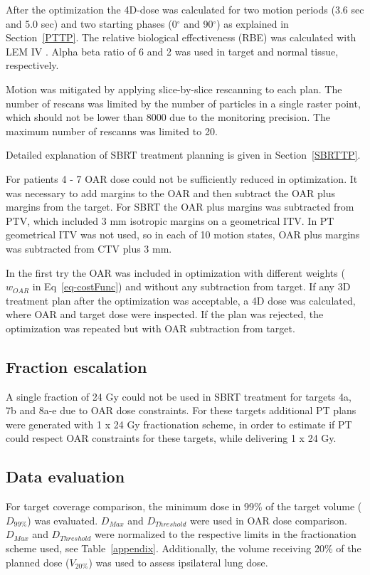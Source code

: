 \documentclass[type=dr, dr=rernat, accentcolor=tud7b,colorbacktitle, bigchapter, openright, twoside, 12pt ]{tudthesis}
\begin{document}
After the optimization the 4D-dose was calculated for two motion periods (3.6 sec and 5.0 sec) and two starting phases (0$^\circ$ and 90$^\circ$) as explained in Section~\ref{PTTP}. 
The relative biological effectiveness (RBE) was calculated with LEM IV \cite{Elsaesser2010}. 
Alpha beta ratio of 6 and 2 was used in target and normal tissue, respectively.

Motion was mitigated by applying slice-by-slice rescanning to each plan. 
The number of rescans was limited by the number of particles in a single raster point, which should not be lower than 8000 due to the
monitoring precision. The maximum number of rescanns was limited to 20.

Detailed explanation of SBRT treatment planning is given in Section~\ref{SBRTTP}.

For patients 4 - 7 OAR dose could not be sufficiently reduced in optimization. It was necessary to add margins to the OAR and then 
subtract the OAR plus margins from the target. For SBRT the OAR plus margins was subtracted from PTV, which included 3 mm isotropic margins on a geometrical ITV. 
In PT geometrical ITV was not used, so in each of 10 motion states, OAR plus margins was subtracted from CTV plus 3 mm. 

In the first try the OAR was included in optimization with different weights ($w_{OAR}$ in Eq~\ref{eq-costFunc}) and without any subtraction from target. 
If any 3D treatment plan after the optimization was acceptable, a 4D dose was calculated, 
where OAR and target dose were inspected. If the plan was rejected, the optimization was repeated but with OAR subtraction from target. 



\subsection{Fraction escalation}

A single fraction of 24 Gy could not be used in SBRT treatment for targets 4a, 7b and 8a-e due to OAR dose constraints. For these targets additional PT plans were generated with 1 x 24 Gy fractionation scheme, in order
to estimate if PT could respect OAR constraints for these targets, while delivering 1 x 24 Gy. 

\subsection{Data evaluation}

For target coverage comparison, the minimum dose in 99\% of the target volume ($D_{99\%}$) was evaluated. $D_{Max}$ and $D_{Threshold}$ were used in OAR dose comparison. $D_{Max}$ and $D_{Threshold}$ were normalized to the respective limits
in the fractionation scheme used, see Table~\ref{appendix}. Additionally, the volume receiving 20\% of the planned dose ($V_{20\%}$) was used to assess ipsilateral lung dose.
\end{document}
